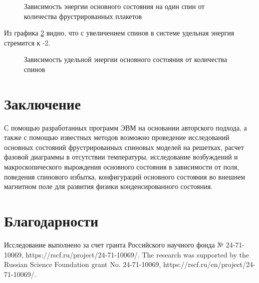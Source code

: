 \documentclass[utf8, babel, sor, jor, amsmath, amssymb, reprint]{elsarticle} %
\begin{document}
\begin{figure}[H]
	\centering
	\caption{Зависимость энергии основного состояния на один спин от количества фрустрированных плакетов}
	\label{fig:Egs_N_F}
\end{figure}

Из графика \ref{fig:Egs____N_F} видно, что с увеличением спинов в системе удельная энергия стремится к -2.

\begin{figure}[H]
	\centering
	\caption{Зависимость удельной энергии основного состояния от количества спинов}
	\label{fig:Egs____N_F}
\end{figure}

\section{Заключение}

С помощью разработанных программ ЭВМ на основании авторского подхода, а также с помощью известных методов возможно проведение исследований основных состояний фрустрированных спиновых моделей на решетках, расчет фазовой диаграммы в отсутствии температуры, исследование возбуждений и макроскопического вырождения основного состояния в зависимости от поля, поведения спинового избытка, конфигураций основного состояния во внешнем магнитном поле для развития физики конденсированного состояния.


\section{Благодарности}

Исследование выполнено за счет гранта Российского научного фонда № 24-71-10069, https://rscf.ru/project/24-71-10069/.
The research was supported by the Russian Science Foundation grant No. 24-71-10069, https://rscf.ru/en/project/24-71-10069/.


\end{document}
